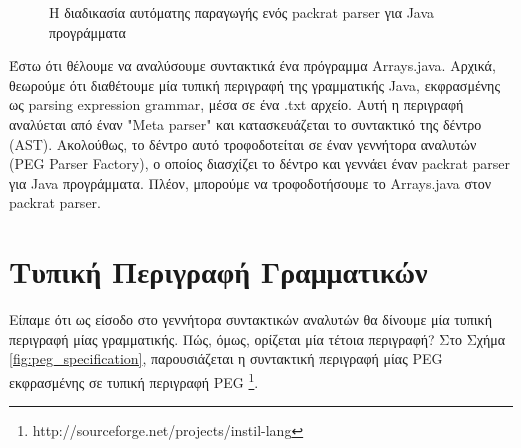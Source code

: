 \documentclass[diploma]{softlab-thesis}
\begin{document}
\begin{figure}[h]
	\label{fig:peg_factory_pipeline}
	\caption{Η διαδικασία αυτόματης παραγωγής ενός packrat parser για Java προγράμματα}
\end{figure}

Έστω ότι θέλουμε να αναλύσουμε συντακτικά ένα πρόγραμμα Arrays.java. 
Αρχικά, θεωρούμε ότι διαθέτουμε μία τυπική περιγραφή της γραμματικής Java, εκφρασμένης ως parsing expression grammar, μέσα σε ένα .txt αρχείο.
Αυτή η περιγραφή αναλύεται από έναν "Meta parser" και κατασκευάζεται το συντακτικό της δέντρο (AST).
Ακολούθως, το δέντρο αυτό τροφοδοτείται σε έναν γεννήτορα αναλυτών (PEG Parser Factory), ο οποίος διασχίζει το δέντρο και γεννάει έναν packrat parser για Java προγράμματα.
Πλέον, μπορούμε να τροφοδοτήσουμε το Arrays.java στον packrat parser.

\section{Τυπική Περιγραφή Γραμματικών}
Είπαμε ότι ως είσοδο στο γεννήτορα συντακτικών αναλυτών θα δίνουμε μία τυπική περιγραφή μίας γραμματικής. 
Πώς, όμως, ορίζεται μία τέτοια περιγραφή? Στο Σχήμα \ref{fig:peg_specification}, παρουσιάζεται η συντακτική περιγραφή μίας PEG εκφρασμένης σε τυπική περιγραφή PEG \footnote{http://sourceforge.net/projects/instil-lang}.
\end{document}
